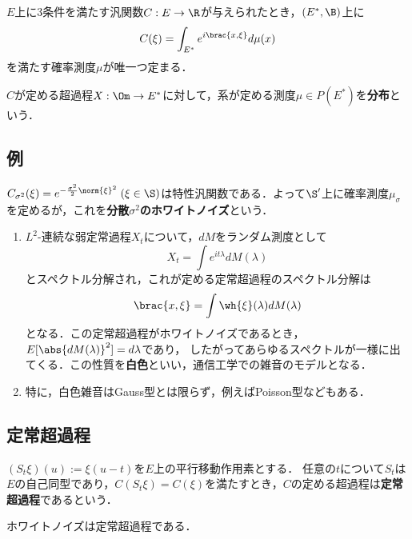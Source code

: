 \documentclass[uplatex,dvipdfmx]{jsreport}
\begin{document}
\begin{corollary}
    $E$上に3条件を満たす汎関数$C:E\to\R$が与えられたとき，$(E^*,\B)$上に
    \[C(\xi)=\int_{E^*}e^{i\brac{x,\xi}}d\mu(x)\]
    を満たす確率測度$\mu$が唯一つ定まる．
\end{corollary}

\begin{definition}
    $C$が定める超過程$X:\Om\to E^*$に対して，系が定める測度$\mu\in P(E^*)$を\textbf{分布}という．
\end{definition}

\subsection{例}

\begin{example}
    $C_{\sigma^2}(\xi)=e^{-\frac{\sigma^2}{2}\norm{\xi}^2}\;(\xi\in\S)$は特性汎関数である．よって$\S'$上に確率測度$\mu_\sigma$を定めるが，これを\textbf{分散$\sigma^2$のホワイトノイズ}という．
    \begin{enumerate}
        \item $L^2$-連続な弱定常過程$X_t$について，$dM$をランダム測度として
        \[X_t=\int e^{it\lambda}dM(\lambda)\]
        とスペクトル分解され，これが定める定常超過程のスペクトル分解は
        \[\brac{x,\xi}=\int\wh{\xi}(\lambda)dM(\lambda)\]
        となる．この定常超過程がホワイトノイズであるとき，$E[\abs{dM(\lambda)}^2]=d\lambda$であり，
        したがってあらゆるスペクトルが一様に出てくる．この性質を\textbf{白色}といい，通信工学での雑音のモデルとなる．
        \item 特に，白色雑音はGauss型とは限らず，例えばPoisson型などもある．
    \end{enumerate}
\end{example}

\subsection{定常超過程}

\begin{definition}
    $(S_t\xi)(u):=\xi(u-t)$を$E$上の平行移動作用素とする．
    任意の$t$について$S_t$は$E$の自己同型であり，$C(S_t\xi)=C(\xi)$を満たすとき，$C$の定める超過程は\textbf{定常超過程}であるという．
\end{definition}

\begin{proposition}
    ホワイトノイズは定常超過程である．
\end{proposition}
\end{document}
